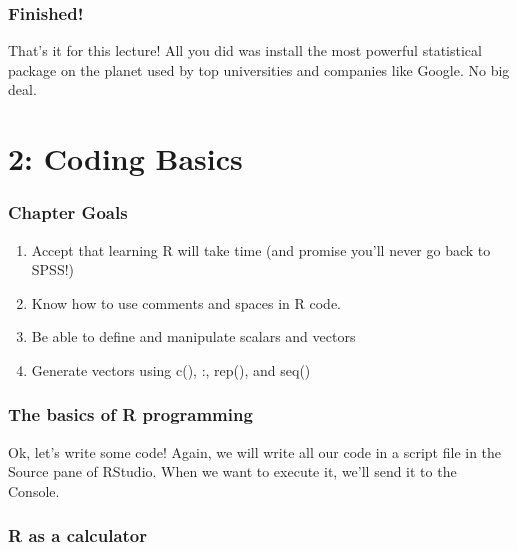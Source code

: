 \documentclass{tufte-book}\usepackage[]{graphicx}\usepackage[]{color}
\begin{document}
\subsection{Finished!}

That's it for this lecture! All you did was install the most powerful statistical package on the planet used by top universities and companies like Google. No big deal.


\chapter{2: Coding Basics}
\label{ch:2}


\subsection{Chapter Goals}

\begin{enumerate}
  \item Accept that learning R will take time (and promise you'll never go back to SPSS!)
  \item Know how to use comments and spaces in R code.
  \item Be able to define and manipulate scalars and vectors
  \item Generate vectors using c(), :, rep(), and seq()
\end{enumerate}



\subsection{The basics of R programming}

Ok, let's write some code! Again, we will write all our code in a script file in the Source pane of RStudio. When we want to execute it, we'll send it to the Console.

\subsection{R as a calculator}
\end{document}
